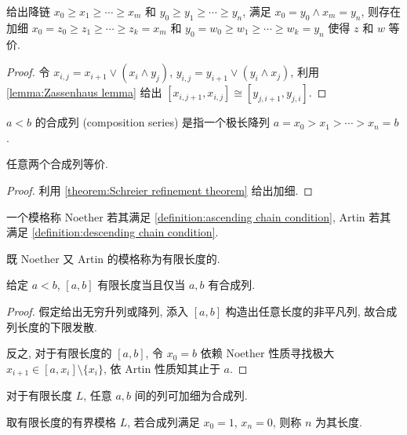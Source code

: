 \begin{theorem}
    \label {theorem:Schreier refinement theorem}
    给出降链 \(x_0 \geq x_1 \geq \cdots \geq x_m\) 和 \(y_0 \geq y_1 \geq \cdots \geq y_n\), 满足 \(x_0 = y_0 \land x_m = y_n\),
    则存在加细 \(x_0 = z_0 \geq z_1 \geq \cdots \geq z_k = x_m\) 和 \(y_0 = w_0 \geq w_1 \geq \cdots \geq w_k = y_n\) 使得 \(z\) 和 \(w\) 等价.

    \begin{proof}
        令 \(x_{i,j} = x_{i+1} \vee (x_i \wedge y_j)\), \(y_{i,j} = y_{i+1} \vee (y_i \wedge x_j)\), 利用 \ref{lemma:Zassenhaus lemma} 给出
        \([x_{i,j+1},x_{i,j}] \cong [y_{j,i+1},y_{j,i}]\).
    \end{proof}
\end{theorem}

\begin{definition}[合成列]
    \(a < b\) 的合成列 (composition series) 是指一个极长降列 \(a = x_0 > x_1 > \cdots > x_n = b\).
\end{definition}

\begin{theorem}
    \label {theorem:Jordan-Holder theorem}
    任意两个合成列等价.

    \begin{proof}
        利用 \ref{theorem:Schreier refinement theorem} 给出加细.
    \end{proof}
\end{theorem}

\begin{definition}[有限长度]
    一个模格称 Noether 若其满足 \ref{definition:ascending chain condition}, Artin 若其满足 \ref{definition:descending chain condition}.

    既 Noether 又 Artin 的模格称为有限长度的.
\end{definition}

\begin{lemma}
    给定 \(a < b\), \([a,b]\) 有限长度当且仅当 \(a,b\) 有合成列.

    \begin{proof}
        假定给出无穷升列或降列, 添入 \([a,b]\) 构造出任意长度的非平凡列, 故合成列长度的下限发散.

        反之, 对于有限长度的 \([a,b]\), 令 \(x_0 = b\) 依赖 Noether 性质寻找极大 \(x_{i+1} \in [a,x_i] \setminus \{x_i\}\), 依 Artin 性质知其止于 \(a\).
    \end{proof}
\end{lemma}

\begin{corollary}
    对于有限长度 \(L\), 任意 \(a,b\) 间的列可加细为合成列.
\end{corollary}

\begin{definition}[长度]
    \label {definition:length of a module lattice}
    取有限长度的有界模格 \(L\), 若合成列满足 \(x_0 = 1\), \(x_n = 0\), 则称 \(n\) 为其长度.
\end{definition}

